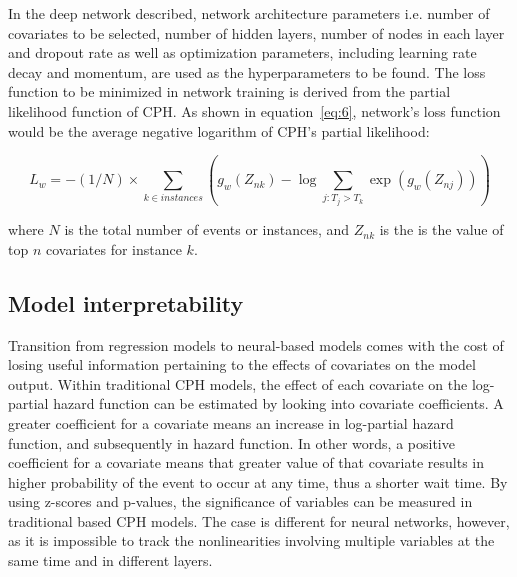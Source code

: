 In the deep network described, network architecture parameters i.e. number of covariates to be selected, number of hidden layers, number of nodes in each layer and dropout rate as well as optimization parameters, including learning rate decay and momentum, are used as the hyperparameters to be found. The loss function to be minimized in network training is derived from the partial likelihood function of CPH. As shown in equation~\ref{eq:6}, network's loss function would be the average negative logarithm of CPH's partial likelihood:
\begin{linenomath}
\begin{equation}
\label{eq:6}
L_w=-({1}/{N})\times \displaystyle \sum_{k\in instances} \left(g_w(Z_{nk}) - \log\displaystyle  \sum_{j: T_j > T_k} \exp({g_w(Z_{nj})}) \right)     
\end{equation}
\end{linenomath}
where $N$ is the total number of events or instances, and $Z_{nk}$ is the is the value of top $n$ covariates for instance $k$.

\subsection{Model interpretability}
Transition from regression models to neural-based models comes with the cost of losing useful information pertaining to the effects of covariates on the model output. Within traditional CPH models, the effect of each covariate on the log-partial hazard function can be estimated by looking into covariate coefficients. A greater coefficient for a covariate means an increase in log-partial hazard function, and subsequently in hazard function. In other words, a positive coefficient for a covariate means that greater value of that covariate results in higher probability of the event to occur at any time, thus a shorter wait time. By using z-scores and p-values, the significance of variables can be measured in traditional based CPH models. The case is different for neural networks, however, as it is impossible to track the nonlinearities involving multiple variables at the same time and in different layers. 

